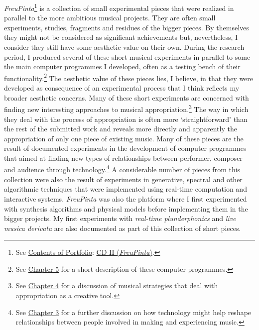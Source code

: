 \emph{FreuPinta}\footnote{See \hyperlink{portfolio}{Contents of Portfolio}: \href{http://www.federicoreuben.com/phd/?page_id=21}{CD II (\emph{FreuPinta})}.} is a collection of small experimental pieces that were realized in parallel to the more ambitious musical projects. They are often small experiments, studies, fragments and residues of the bigger pieces. By themselves they might not be considered as significant achievements but, nevertheless, I consider they still have some aesthetic value on their own. During the research period, I produced several of these short musical experiments in parallel to some the main computer programmes I developed, often as a testing bench of their functionality.\footnote{See \hyperlink{chapter5}{Chapter 5} for a short description of these computer programmes.} The aesthetic value of these pieces lies, I believe, in that they were developed as consequence of an experimental process that I think reflects my broader aesthetic concerns. Many of these short experiments are concerned with finding new interesting approaches to musical appropriation.\footnote{See \hyperlink{chapter4}{Chapter 4} for a discussion of musical strategies that deal with appropriation as a creative tool.} The way in which they deal with the process of appropriation is often more `straightforward' than the rest of the submitted work and reveals more directly and apparently the appropriation of only one piece of existing music. Many of these pieces are the result of documented experiments in the development of computer programmes that aimed at finding new types of relationships between performer, composer and audience through technology.\footnote{See \hyperlink{chapter3}{Chapter 3} for a further discussion on how technology might help reshape relationships between people involved in making and experiencing music.} A considerable number of pieces from this collection were also the result of experiments in generative, spectral and other algorithmic techniques that were implemented using real-time computation and interactive systems. \emph{FreuPinta} was also the platform where I first experimented with synthesis algorithms and physical models before implementing them in the bigger projects. My first experiments with \emph{real-time plunderphonics} and \emph{live musica derivata} are also documented as part of this collection of short pieces.

